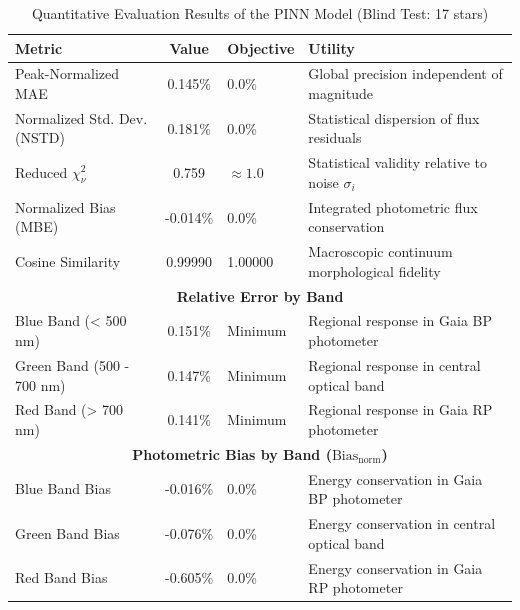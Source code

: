 
\begin{table}[htpb]
\centering
\caption{Quantitative Evaluation Results of the PINN Model (Blind Test: 17 stars)}
\label{tab:pinn_evaluation}
\begin{tabular}{lcll}
\hline
\textbf{Metric} & \textbf{Value} & \textbf{Objective} & \textbf{Utility} \\
\hline
Peak-Normalized MAE & 0.145\% & 0.0\% & Global precision independent of magnitude \\
Normalized Std. Dev. (NSTD) & 0.181\% & 0.0\% & Statistical dispersion of flux residuals \\
Reduced $\chi^2_\nu$ & 0.759 & $\approx 1.0$ & Statistical validity relative to noise $\sigma_i$ \\
Normalized Bias (MBE) & -0.014\% & 0.0\% & Integrated photometric flux conservation \\
Cosine Similarity & 0.99990 & 1.00000 & Macroscopic continuum morphological fidelity \\
\hline
\multicolumn{4}{c}{\textbf{Relative Error by Band}} \\
\hline
Blue Band (< 500 nm) & 0.151\% & Minimum & Regional response in Gaia BP photometer \\
Green Band (500 - 700 nm) & 0.147\% & Minimum & Regional response in central optical band \\
Red Band (> 700 nm) & 0.141\% & Minimum & Regional response in Gaia RP photometer \\
\hline
\multicolumn{4}{c}{\textbf{Photometric Bias by Band ($\text{Bias}_{\text{norm}}$)}} \\
\hline
Blue Band Bias & -0.016\% & 0.0\% & Energy conservation in Gaia BP photometer \\
Green Band Bias & -0.076\% & 0.0\% & Energy conservation in central optical band \\
Red Band Bias & -0.605\% & 0.0\% & Energy conservation in Gaia RP photometer \\
\hline
\end{tabular}
\end{table}
